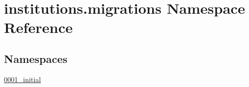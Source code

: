 \hypertarget{namespaceinstitutions_1_1migrations}{\section{institutions.\-migrations Namespace Reference}
\label{namespaceinstitutions_1_1migrations}
}
\subsection*{Namespaces}
\begin{DoxyCompactItemize}
\item 
\hyperlink{namespaceinstitutions_1_1migrations_1_10001__initial}{0001\-\_\-initial}
\end{DoxyCompactItemize}
